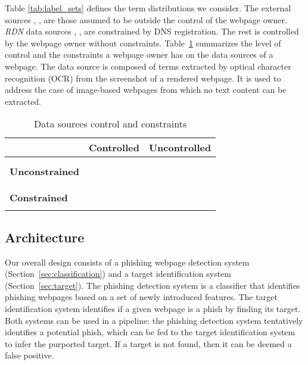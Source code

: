 \documentclass[10pt,conference,compsocconf,letterpaper]{IEEEtran}
\begin{document}
Table \ref{tab:label_sets} defines the term distributions we consider.
The external sources , ,  are those assumed to be outside the control of the webpage owner. \textit{RDN} data sources , ,  are constrained by DNS registration. The rest is controlled by the webpage owner without constraints.
\iffullversion
Table~\ref{tab:set_constraints} summarizes the level of control and the constraints a webpage owner has on the data sources of a webpage.
\fi
The  data source is composed of terms extracted by optical character recognition (OCR) from the screenshot of a rendered webpage. 
\iffeateval
It is used to address the case of image-based webpages from which no text content can be extracted.
\fi






\iffullversion
 \begin{table}[tbh]
 \centering
 \caption{Data sources control and constraints}
 \label{tab:set_constraints}
 \begin{tabular}{l l l}
 								& \textbf{Controlled} & \textbf{Uncontrolled} \\ \hline
 \multirow{8}{*}{\textbf{Unconstrained}} &  &  \\
 								&  &  \\
 								&   & \\
 								&  & \\ 
 								&  & \\
 								&  & \\
 								&  & \\
 								&  & \\ \hline								
 								&  &  \\
 \textbf{Constrained}	&  & \\
 								&  & \\								
 
 \end{tabular}
 \end{table}
 \fi

\subsection{Architecture}
Our overall design consists of a phishing webpage detection system (Section~\ref{sec:classification}) and a target identification system (Section~\ref{sec:target}). The phishing detection system is a classifier that identifies phishing webpages based on a set of newly introduced features. The target identification system identifies if a given webpage is a phish by finding its target. Both systems can be used in a pipeline: the phishing detection system tentatively identifies a potential phish, which can be fed to the target identification system to infer the purported target.
\iffeateval
If a target is not found, then it can be deemed a false positive.
\fi
\end{document}
